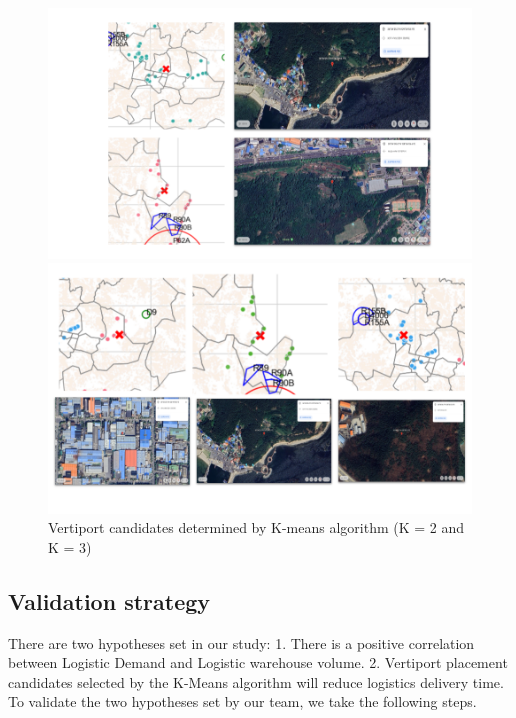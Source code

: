 \documentclass[11pt]{article}
\begin{document}
    \begin{figure}[H]
      \centering
      \begin{minipage}{0.5\textwidth}
        \centering
        \includegraphics[width=\linewidth]{figure/K2_gm.png}
      \end{minipage}%
      \begin{minipage}{0.5\textwidth}
        \centering
        \includegraphics[width=\linewidth]{figure/K3_gm.png}
      \end{minipage}%
      \caption{Vertiport candidates determined by K-means algorithm (K = 2 and K = 3)}
      \label{fig:overall}
    \end{figure}

    
    \subsection{Validation strategy}
    There are two hypotheses set in our study: 1. There is a positive correlation between Logistic Demand and Logistic warehouse volume. 2. Vertiport placement candidates selected by the K-Means algorithm will reduce logistics delivery time. To validate the two hypotheses set by our team, we take the following steps. \
\end{document}
